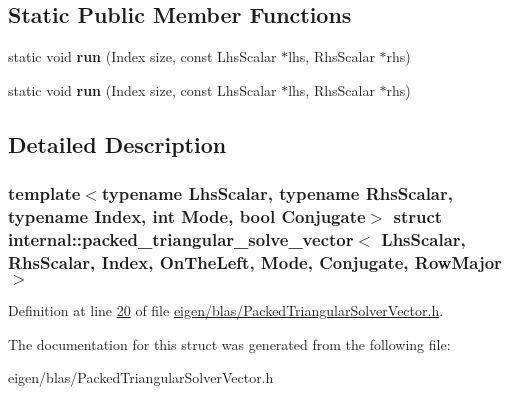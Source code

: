 \subsection*{Static Public Member Functions}
\begin{DoxyCompactItemize}
\item 
\mbox{\label{structinternal_1_1packed__triangular__solve__vector_3_01_lhs_scalar_00_01_rhs_scalar_00_01_indexc5a73935a3beb9907eb3aa30bec77d7b_a1f4ef79683075f1d2bea057c14a5f5b1}} 
static void {\bfseries run} (Index size, const Lhs\+Scalar $\ast$lhs, Rhs\+Scalar $\ast$rhs)
\item 
\mbox{\label{structinternal_1_1packed__triangular__solve__vector_3_01_lhs_scalar_00_01_rhs_scalar_00_01_indexc5a73935a3beb9907eb3aa30bec77d7b_a1f4ef79683075f1d2bea057c14a5f5b1}} 
static void {\bfseries run} (Index size, const Lhs\+Scalar $\ast$lhs, Rhs\+Scalar $\ast$rhs)
\end{DoxyCompactItemize}


\subsection{Detailed Description}
\subsubsection*{template$<$typename Lhs\+Scalar, typename Rhs\+Scalar, typename Index, int Mode, bool Conjugate$>$\newline
struct internal\+::packed\+\_\+triangular\+\_\+solve\+\_\+vector$<$ Lhs\+Scalar, Rhs\+Scalar, Index, On\+The\+Left, Mode, Conjugate, Row\+Major $>$}



Definition at line \hyperlink{eigen_2blas_2_packed_triangular_solver_vector_8h_source_l00020}{20} of file \hyperlink{eigen_2blas_2_packed_triangular_solver_vector_8h_source}{eigen/blas/\+Packed\+Triangular\+Solver\+Vector.\+h}.



The documentation for this struct was generated from the following file\+:\begin{DoxyCompactItemize}
\item 
eigen/blas/\+Packed\+Triangular\+Solver\+Vector.\+h\end{DoxyCompactItemize}
